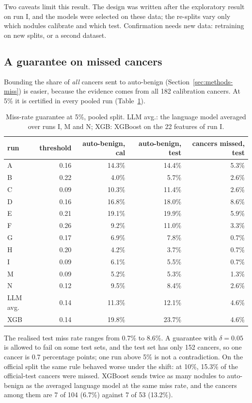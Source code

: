 Two caveats limit this result. The design was written after the exploratory result on run I, and
the models were selected on these data; the re-splits vary only which nodules calibrate and which
test. Confirmation needs new data: retraining on new splits, or a second dataset.

\subsection{A guarantee on missed cancers}

Bounding the share of \emph{all} cancers sent to auto-benign (Section~\ref{sec:methods-miss}) is
easier, because the evidence comes from all 182 calibration cancers. At 5\% it is certified in
every pooled run (Table~\ref{tab:results-miss}).

\begin{table}[ht]
  \centering
  \small
  \caption{Miss-rate guarantee at 5\%, pooled split. LLM avg.: the language model averaged over
           runs I, M and N; XGB: XGBoost on the 22 features of run I.}
  \label{tab:results-miss}
  \begin{tabular}{lrrrr}
    \toprule
    run & threshold & auto-benign, cal & auto-benign, test & cancers missed, test \\
    \midrule
    A & 0.16 & 14.3\% & 14.4\% & 5.3\% \\
    B & 0.22 &  4.0\% &  5.7\% & 2.6\% \\
    C & 0.09 & 10.3\% & 11.4\% & 2.6\% \\
    D & 0.16 & 16.8\% & 18.0\% & 8.6\% \\
    E & 0.21 & 19.1\% & 19.9\% & 5.9\% \\
    F & 0.26 &  9.2\% & 11.0\% & 3.3\% \\
    G & 0.17 &  6.9\% &  7.8\% & 0.7\% \\
    H & 0.20 &  4.2\% &  3.7\% & 0.7\% \\
    I & 0.09 &  6.1\% &  5.5\% & 0.7\% \\
    M & 0.09 &  5.2\% &  5.3\% & 1.3\% \\
    N & 0.12 &  9.5\% &  8.4\% & 2.6\% \\
    \midrule
    LLM avg. & 0.14 & 11.3\% & 12.1\% & 4.6\% \\
    XGB & 0.14 & 19.8\% & 23.7\% & 4.6\% \\
    \bottomrule
  \end{tabular}
\end{table}

The realised test miss rate ranges from 0.7\% to 8.6\%. A guarantee with $\delta = 0.05$ is
allowed to fail on some test sets, and the test set has only 152 cancers, so one cancer is 0.7
percentage points; one run above 5\% is not a contradiction. On the official split the same rule
behaved worse under the shift: at 10\%, 15.3\% of the official-test cancers were missed. XGBoost
sends twice as many nodules to auto-benign as the averaged language model at the same miss rate,
and the cancers among them are 7 of 104 (6.7\%) against 7 of 53 (13.2\%).

